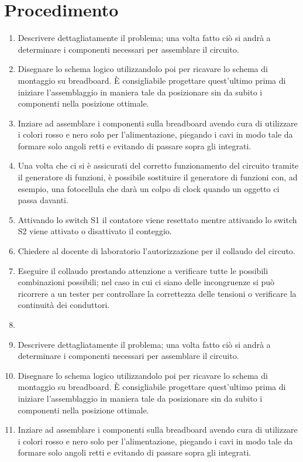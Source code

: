 \documentclass[a4paper, 10pt]{RelazioneLab}
\begin{document}
\section{Procedimento}
    \begin{enumerate}
        \item Descrivere dettagliatamente il problema; una volta fatto ciò si andrà a determinare i componenti necessari per assemblare il circuito.
        \item Disegnare lo schema logico utilizzandolo poi per ricavare lo schema di montaggio su breadboard. È consigliabile progettare quest'ultimo prima di iniziare l'assemblaggio in maniera tale da posizionare sin da subito i componenti nella posizione ottimale.
        \item Inziare ad assemblare i componenti sulla breadboard avendo cura di utilizzare i colori rosso e nero solo per l'alimentazione, piegando i cavi in modo tale da formare solo angoli retti e evitando di passare sopra gli integrati. 
        \item Una volta che ci si è assicurati del corretto funzionamento del circuito tramite il generatore di funzioni, è possibile sostituire il generatore di funzioni con, ad esempio, una fotocellula che darà un colpo di clock quando un oggetto ci passa davanti.
        \item Attivando lo switch S1 il contatore viene resettato mentre attivando lo switch S2 viene attivato o disattivato il conteggio. 
        \item Chiedere al docente di laboratorio l'autorizzazione per il collaudo del circuto.
        \item Eseguire il collaudo prestando attenzione a verificare tutte le possibili combinazioni possibili; nel caso in cui ci siano delle incongruenze si può ricorrere a un tester per controllare la correttezza delle tensioni o verificare la continuità dei conduttori.
        \item \item Descrivere dettagliatamente il problema; una volta fatto ciò si andrà a determinare i componenti necessari per assemblare il circuito.
        \item Disegnare lo schema logico utilizzandolo poi per ricavare lo schema di montaggio su breadboard. È consigliabile progettare quest'ultimo prima di iniziare l'assemblaggio in maniera tale da posizionare sin da subito i componenti nella posizione ottimale.
        \item Inziare ad assemblare i componenti sulla breadboard avendo cura di utilizzare i colori rosso e nero solo per l'alimentazione, piegando i cavi in modo tale da formare solo angoli retti e evitando di passare sopra gli integrati. 

\end{enumerate}
\end{document}
